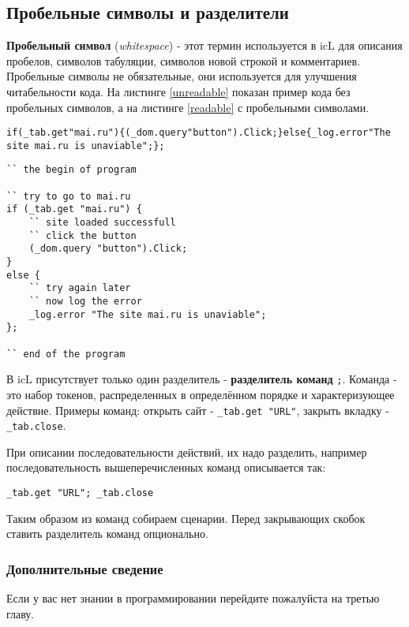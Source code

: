 \documentclass[a4paper, 14pt]{extarticle}
\begin{document}
\subsection{Пробельные символы и разделители}
	
	\textbf{Пробельный символ} (\textit{whitespace}) - этот термин используется в icL для описания пробелов, символов табуляции, символов новой строкой и комментариев. Пробельные символы не обязательные, они используется для улучшения читабельности кода. На листинге \ref{unreadable} показан пример кода без пробельных символов, а на листинге \ref{readable} с пробельными символами.
	
\begin{lstlisting}[caption=Koд без пробельных символов,label=unreadable]
if(_tab.get"mai.ru"){(_dom.query"button").Click;}else{_log.error"The site mai.ru is unaviable";};
\end{lstlisting}
	
\begin{lstlisting}[caption=Koд с пробельных символов,label=readable]
`` the begin of program

`` try to go to mai.ru
if (_tab.get "mai.ru") {
	`` site loaded successfull
	`` click the button
	(_dom.query "button").Click;
}
else {
	`` try again later
	`` now log the error
	_log.error "The site mai.ru is unaviable";
};

`` end of the program
\end{lstlisting}
	
	В icL присутствует только один разделитель - \textbf{разделитель команд} \lstinline`;`. Команда - это набор токенов, распределенных в определённом порядке и характеризующее действие. Примеры команд: открыть сайт - \lstinline`_tab.get "URL"`, закрыть вкладку - \lstinline`_tab.close`.
	
	При описании последовательности действий, их надо разделить, например последовательность вышеперечисленных команд описывается так:	
\begin{lstlisting}[numbers=none]
_tab.get "URL"; _tab.close
\end{lstlisting} 
	
	Таким образом из команд собираем сценарии. Перед закрывающих скобок ставить разделитель команд опционально.
	
\subsubsection{Дополнительные сведение}
	
	Если у вас нет знании в программировании перейдите пожалуйста на третью главу.
	
\end{document}
